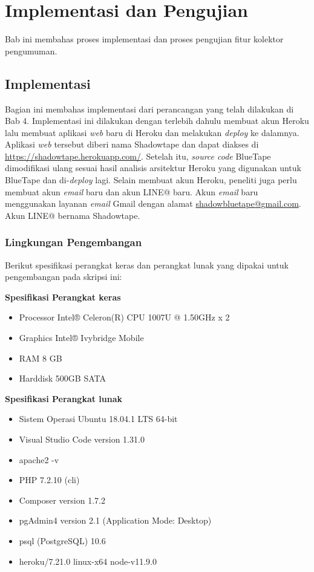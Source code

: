 
\chapter{Implementasi dan Pengujian}
\label{chap:implementasiDanPengujian}

Bab ini membahas proses implementasi dan proses pengujian fitur kolektor pengumuman.
\section{Implementasi}
Bagian ini membahas implementasi dari perancangan yang telah dilakukan di Bab 4. Implementasi ini dilakukan dengan terlebih dahulu membuat akun Heroku lalu membuat aplikasi \textit{web} baru di Heroku dan melakukan \textit{deploy} ke dalamnya. Aplikasi \textit{web} tersebut diberi nama Shadowtape dan dapat diakses di \url{https://shadowtape.herokuapp.com/}. Setelah itu, \textit{source code} BlueTape dimodifikasi ulang sesuai hasil analisis arsitektur Heroku yang digunakan untuk BlueTape dan di-\textit{deploy} lagi. Selain membuat akun Heroku, peneliti juga perlu membuat akun \textit{email} baru dan akun LINE@ baru. Akun \textit{email} baru menggunakan layanan \textit{email} Gmail dengan alamat \href{mail-to:shadowbluetape@gmail.com}{shadowbluetape@gmail.com}. Akun LINE@ bernama Shadowtape.

\subsection{Lingkungan Pengembangan}
Berikut spesifikasi perangkat keras dan perangkat lunak yang dipakai untuk pengembangan pada skripsi ini:

\textbf{Spesifikasi Perangkat keras}
\begin{itemize}
\item Processor Intel® Celeron(R) CPU 1007U @ 1.50GHz x 2 
\item Graphics Intel® Ivybridge Mobile
\item RAM 8 GB
\item Harddisk 500GB SATA
\end{itemize}

\textbf{Spesifikasi Perangkat lunak}
\begin{itemize}
\item Sistem Operasi Ubuntu 18.04.1 LTS 64-bit
\item Visual Studio Code version 1.31.0
\item apache2 -v
\item PHP 7.2.10 (cli)
\item Composer version 1.7.2
\item pgAdmin4 version 2.1 (Application Mode: Desktop)
\item psql (PostgreSQL) 10.6
\item heroku/7.21.0 linux-x64 node-v11.9.0
\end{itemize}


